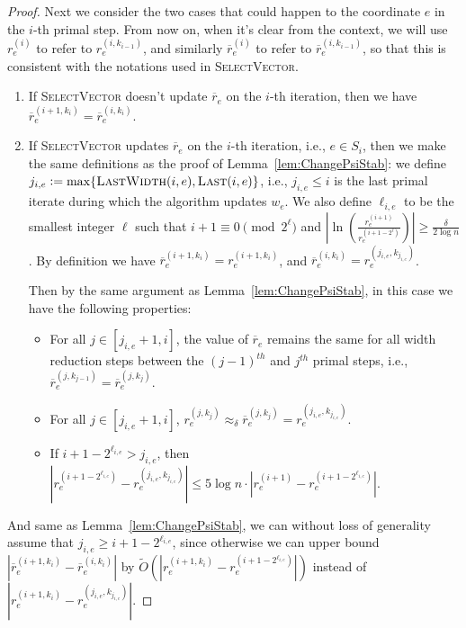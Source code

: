 \documentclass[11pt]{article}
\newcommand\rr{\boldsymbol{\mathit{r}}}
\newcommand\ww{\boldsymbol{\mathit{w}}}
\newcommand\rrbar{\overline{\boldsymbol{\mathit{r}}}}
\newcommand{\wt}{\widetilde}
\newcommand{\ov}{\overline}
\begin{document}
\begin{proof}
Next we consider the two cases that could happen to the coordinate $e$ in the $i$-th primal step. From now on, when it's clear from the context, we will use $\rr_e^{(i)}$ to refer to $\rr_e^{(i,k_{i-1})}$, and similarly $\rrbar_e^{(i)}$ to refer to $\rrbar_e^{(i,k_{i-1})}$, so that this is consistent with the notations used in \textsc{SelectVector}.
\begin{enumerate}
\item If \textsc{SelectVector} doesn't update $\ov{\rr}_e$ on the $i$-th iteration, then we have $\ov{\rr}^{(i+1,k_i)}_e = \ov{\rr}^{(i,k_i)}_e$. 
\item  If \textsc{SelectVector} updates $\ov{\rr}_e$ on the $i$-th iteration, i.e., $e \in S_i$, then we make the same definitions as the proof of Lemma~\ref{lem:ChangePsiStab}: we define $j_{i,e} := \max\{\textsc{LastWidth}(i,e), \textsc{Last}(i,e)\}$, i.e., $j_{i,e} \leq i$ is the last primal iterate during which the algorithm updates $\ww_e$. We also define $\ell_{i,e}$ to be the smallest integer $\ell$ such that $i+1 \equiv 0 \pmod{2^{\ell}}$ and $|\ln(\frac{\rr_e^{(i+1)}}{\rr_e^{(i+1-2^\ell)}})| \geq \frac{\delta}{2 \log n}$. 
By definition we have $\ov{\rr}^{(i+1,k_i)}_e = \rr^{(i+1,k_i)}_e$, and $\ov{\rr}^{(i,k_i)}_e = \rr^{(j_{i,e},k_{j_{i,e}})}_e$. 

Then by the same argument as Lemma~\ref{lem:ChangePsiStab}, in this case we have the following properties:
\begin{itemize}
\item For all $j \in [j_{i,e}+1, i]$, the value of $\rrbar_e$ remains the same for all width reduction steps between the $(j-1)^{th}$ and $j^{th}$ primal steps, i.e., $\rrbar^{(j,k_{j-1})}_e = \rrbar^{(j,k_{j})}_e$. 
\item For all $j \in [j_{i,e}+1, i]$, $\rr_e^{(j,k_j)} \approx_{\delta} \ov{\rr}_e^{(j,k_j)} = \rr_e^{(j_{i,e},k_{j_{i,e}})}$. 
\item If $i+1-2^{\ell_{i,e}} > j_{i,e}$, then $|\rr_e^{(i+1-2^{\ell_{i,e}})} - \rr_e^{(j_{i,e},k_{j_{i,e}})}| \leq 5 \log n \cdot |\rr_e^{(i+1)} - \rr_e^{(i+1-2^{\ell_{i,e}})}|$.
\end{itemize}
\end{enumerate}
And same as Lemma~\ref{lem:ChangePsiStab}, we can without loss of generality assume that $j_{i,e} \geq i+1-2^{\ell_{i,e}}$, since otherwise we can upper bound $|\ov{\rr}^{(i+1,k_i)}_e - \ov{\rr}^{(i ,k_i)}_e|$ by $\wt{O}(|\rr^{(i+1,k_i)}_e - \rr^{(i+1-2^{\ell_{i,e}})}_e|)$ instead of $|\rr_e^{(i+1,k_i)} - \rr_e^{(j_{i,e},k_{j_{i,e}})}|$.


\end{proof}
\end{document}
